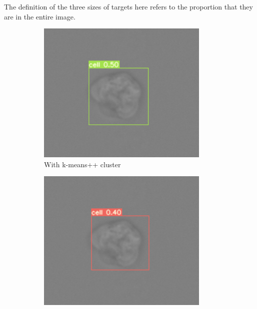 The definition of the three sizes of targets here refers to the proportion that they are in the entire image.

\begin{figure}[h]
	\begin{center}
		\begin{subfigure}[b]{0.49\textwidth}
		    \centering
			\includegraphics[width=0.9\textwidth]{thesis-template-master/images/withkmean.png}
			\caption{With k-means++ cluster}
			\label{fig:cellnet}
		\end{subfigure}
		\begin{subfigure}[b]{0.49\textwidth}
		    \centering
			\includegraphics[width=0.9\textwidth]{thesis-template-master/images/withoutkmean.png}

\end{subfigure}
\end{center}
\end{figure}
